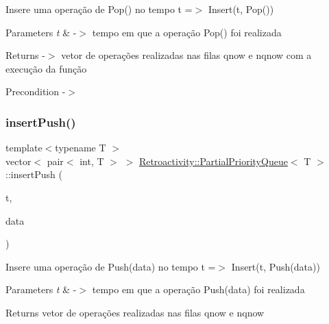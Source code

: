 Insere uma operação de Pop() no tempo t =$>$ Insert(t, Pop())


\begin{DoxyParams}{Parameters}
{\em t} & -\/$>$ tempo em que a operação Pop() foi realizada \\
\hline
\end{DoxyParams}
\begin{DoxyReturn}{Returns}
-\/$>$ vetor de operações realizadas nas filas qnow e nqnow com a execução da função 
\end{DoxyReturn}
\begin{DoxyPrecond}{Precondition}
-\/$>$ 
\end{DoxyPrecond}
\mbox{\label{classRetroactivity_1_1PartialPriorityQueue_aeeb8ac70ed65a8110fa74d14311ef038}} 
\subsubsection{\texorpdfstring{insert\+Push()}{insertPush()}}
{\footnotesize\ttfamily template$<$typename T $>$ \\
vector$<$ pair$<$ int, T $>$ $>$ \hyperlink{classRetroactivity_1_1PartialPriorityQueue}{Retroactivity\+::\+Partial\+Priority\+Queue}$<$ T $>$\+::insert\+Push (\begin{DoxyParamCaption}\item[{int}]{t,  }\item[{T}]{data }\end{DoxyParamCaption})}

Insere uma operação de Push(data) no tempo t =$>$ Insert(t, Push(data))


\begin{DoxyParams}{Parameters}
{\em t} & -\/$>$ tempo em que a operação Push(data) foi realizada \\
\hline
\end{DoxyParams}
\begin{DoxyReturn}{Returns}
vetor de operações realizadas nas filas qnow e nqnow 
\end{DoxyReturn}
\mbox{\label{classRetroactivity_1_1PartialPriorityQueue_ae2aee692f0e15ecf1e580b2607bc873b}} 
